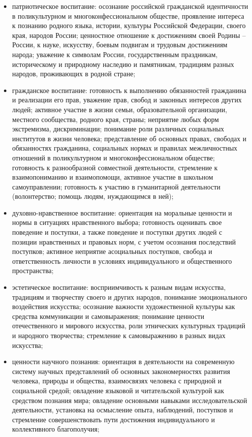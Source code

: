 \documentclass[
  11pt,
]{book}
\begin{document}
\begin{itemize}
\item
  патриотическое воспитание: осознание российской гражданской идентичности в поликультурном и многоконфессиональном обществе, проявление интереса к познанию родного языка, истории, культуры Российской Федерации, своего края, народов России; ценностное отношение к достижениям своей Родины -- России, к науке, искусству, боевым подвигам и трудовым достижениям народа; уважение к символам России, государственным праздникам, историческому и природному наследию и памятникам, традициям разных народов, проживающих в родной стране;
\item
  гражданское воспитание: готовность к выполнению обязанностей гражданина и реализации его прав, уважение прав, свобод и законных интересов других людей; активное участие в жизни семьи, образовательной организации, местного сообщества, родного края, страны; неприятие любых форм экстремизма, дискриминации; понимание роли различных социальных институтов в жизни человека; представление об основных правах, свободах и обязанностях гражданина, социальных нормах и правилах межличностных отношений в поликультурном и многоконфессиональном обществе; готовность к разнообразной совместной деятельности, стремление к взаимопониманию и взаимопомощи, активное участие в школьном самоуправлении; готовность к участию в гуманитарной деятельности (волонтерство; помощь людям, нуждающимся в ней);
\item
  духовно-нравственное воспитание: ориентация на моральные ценности и нормы в ситуациях нравственного выбора; готовность оценивать свое поведение и поступки, а также поведение и поступки других людей с позиции нравственных и правовых норм, с учетом осознания последствий поступков; активное неприятие асоциальных поступков, свобода и ответственность личности в условиях индивидуального и общественного пространства;
\item
  эстетическое воспитание: восприимчивость к разным видам искусства, традициям и творчеству своего и других народов, понимание эмоционального воздействия искусства; осознание важности художественной культуры как средства коммуникации и самовыражения; понимание ценности отечественного и мирового искусства, роли этнических культурных традиций и народного творчества; стремление к самовыражению в разных видах искусства;
\item
  ценности научного познания: ориентация в деятельности на современную систему научных представлений об основных закономерностях развития человека, природы и общества, взаимосвязях человека с природной и социальной средой; овладение языковой и читательской культурой как средством познания мира; овладение основными навыками исследовательской деятельности, установка на осмысление опыта, наблюдений, поступков и стремление совершенствовать пути достижения индивидуального и коллективного благополучия;

\end{itemize}
\end{document}
